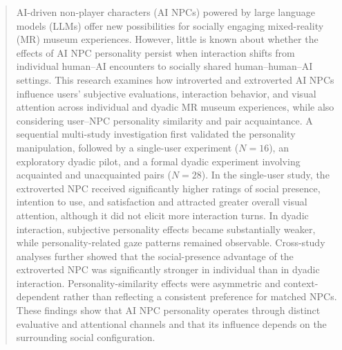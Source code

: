 \documentclass[a4paper,fleqn]{cas-sc}
\begin{document}



\begin{abstract}
AI-driven non-player characters (AI NPCs) powered by large language models (LLMs) offer new possibilities for socially engaging mixed-reality (MR) museum experiences. However, little is known about whether the effects of AI NPC personality persist when interaction shifts from individual human--AI encounters to socially shared human--human--AI settings. This research examines how introverted and extroverted AI NPCs influence users' subjective evaluations, interaction behavior, and visual attention across individual and dyadic MR museum experiences, while also considering user--NPC personality similarity and pair acquaintance. A sequential multi-study investigation first validated the personality manipulation, followed by a single-user experiment ($N=16$), an exploratory dyadic pilot, and a formal dyadic experiment involving acquainted and unacquainted pairs ($N=28$). In the single-user study, the extroverted NPC received significantly higher ratings of social presence, intention to use, and satisfaction and attracted greater overall visual attention, although it did not elicit more interaction turns. In dyadic interaction, subjective personality effects became substantially weaker, while personality-related gaze patterns remained observable. Cross-study analyses further showed that the social-presence advantage of the extroverted NPC was significantly stronger in individual than in dyadic interaction. Personality-similarity effects were asymmetric and context-dependent rather than reflecting a consistent preference for matched NPCs. These findings show that AI NPC personality operates through distinct evaluative and attentional channels and that its influence depends on the surrounding social configuration.
\end{abstract}


\end{document}
